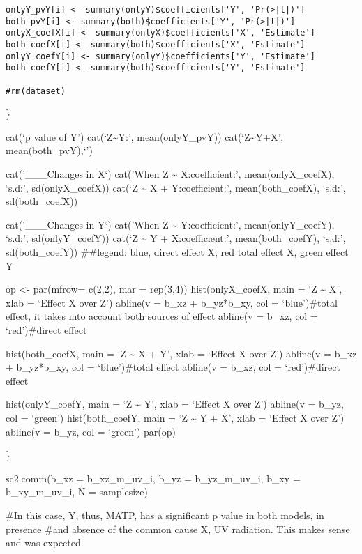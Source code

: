 \documentclass[
]{article}
\begin{document}
\begin{verbatim}
onlyY_pvY[i] <- summary(onlyY)$coefficients['Y', 'Pr(>|t|)']
both_pvY[i] <- summary(both)$coefficients['Y', 'Pr(>|t|)']
onlyX_coefX[i] <- summary(onlyX)$coefficients['X', 'Estimate']
both_coefX[i] <- summary(both)$coefficients['X', 'Estimate']
onlyY_coefY[i] <- summary(onlyY)$coefficients['Y', 'Estimate']
both_coefY[i] <- summary(both)$coefficients['Y', 'Estimate']

#rm(dataset)
\end{verbatim}

\}

cat(`p value of Y') cat(`\nWhen Z\textasciitilde Y:', mean(onlyY\_pvY))
cat(`\nWhen Z\textasciitilde Y+X', mean(both\_pvY),`\n\n')

cat('\_\_\_Changes in X\n`) cat('When Z \textasciitilde{}
X:\nX coefficient:', mean(onlyX\_coefX), `s.d:', sd(onlyX\_coefX))
cat(`\nWhen Z \textasciitilde{} X + Y:\nX coefficient:',
mean(both\_coefX), `s.d:', sd(both\_coefX))

cat('\n\n\_\_\_Changes in Y\n`) cat('When Z \textasciitilde{}
Y:\nY coefficient:', mean(onlyY\_coefY), `s.d:', sd(onlyY\_coefY))
cat(`\nWhen Z \textasciitilde{} Y + X:\nY coefficient:',
mean(both\_coefY), `s.d:', sd(both\_coefY)) \#\#legend: blue, direct
effect X, red total effect X, green effect Y

op \textless- par(mfrow= c(2,2), mar = rep(3,4)) hist(onlyX\_coefX, main
= `Z \textasciitilde{} X', xlab = `Effect X over Z') abline(v = b\_xz +
b\_yz*b\_xy, col = `blue')\#total effect, it takes into account both
sources of effect abline(v = b\_xz, col = `red')\#direct effect

hist(both\_coefX, main = `Z \textasciitilde{} X + Y', xlab = `Effect X
over Z') abline(v = b\_xz + b\_yz*b\_xy, col = `blue')\#total effect
abline(v = b\_xz, col = `red')\#direct effect

hist(onlyY\_coefY, main = `Z \textasciitilde{} Y', xlab = `Effect X over
Z') abline(v = b\_yz, col = `green') hist(both\_coefY, main = `Z
\textasciitilde{} Y + X', xlab = `Effect X over Z') abline(v = b\_yz,
col = `green') par(op)

\}

sc2.comm(b\_xz = b\_xz\_m\_uv\_i, b\_yz = b\_yz\_m\_uv\_i, b\_xy =
b\_xy\_m\_uv\_i, N = samplesize)

\#In this case, Y, thus, MATP, has a significant p value in both models,
in presence \#and absence of the common cause X, UV radiation. This
makes sense and was expected.
\end{document}
